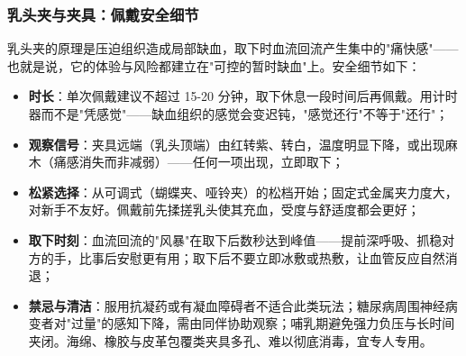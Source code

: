 \subsubsection{乳头夹与夹具：佩戴安全细节}

乳头夹的原理是压迫组织造成局部缺血，取下时血流回流产生集中的"痛快感"——也就是说，它的体验与风险都建立在"可控的暂时缺血"上。安全细节如下：

\begin{itemize}
\item \textbf{时长}：单次佩戴建议不超过 15-20 分钟，取下休息一段时间后再佩戴。用计时器而不是"凭感觉"——缺血组织的感觉会变迟钝，"感觉还行"不等于"还行"；
\item \textbf{观察信号}：夹具远端（乳头顶端）由红转紫、转白，温度明显下降，或出现麻木（痛感消失而非减弱）——任何一项出现，立即取下；
\item \textbf{松紧选择}：从可调式（蝴蝶夹、哑铃夹）的松档开始；固定式金属夹力度大，对新手不友好。佩戴前先揉搓乳头使其充血，受度与舒适度都会更好；
\item \textbf{取下时刻}：血流回流的"风暴"在取下后数秒达到峰值——提前深呼吸、抓稳对方的手，比事后安慰更有用；取下后不要立即冰敷或热敷，让血管反应自然消退；
\item \textbf{禁忌与清洁}：服用抗凝药或有凝血障碍者不适合此类玩法；糖尿病周围神经病变者对"过量"的感知下降，需由同伴协助观察；哺乳期避免强力负压与长时间夹闭。海绵、橡胶与皮革包覆类夹具多孔、难以彻底消毒，宜专人专用。
\end{itemize}
